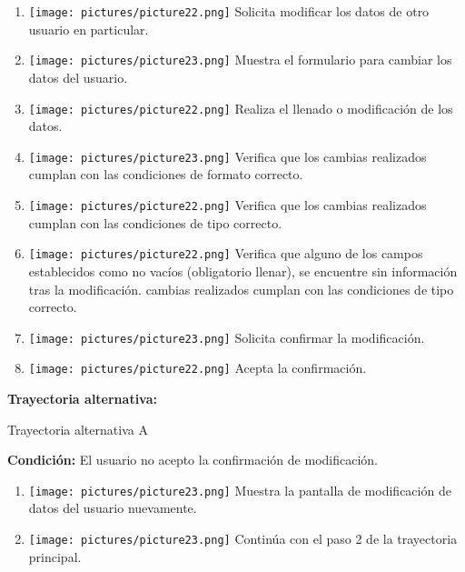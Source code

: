 \begin{enumerate} 
\item \texttt{[image: pictures/picture22.png]} Solicita modificar los datos de otro usuario en particular.
\item \texttt{[image: pictures/picture23.png]} Muestra el formulario para cambiar los datos del usuario.
\item \texttt{[image: pictures/picture22.png]} Realiza el llenado o modificación de los datos.
\item \texttt{[image: pictures/picture23.png]} Verifica que los cambias realizados cumplan con las condiciones de formato correcto.
\item \texttt{[image: pictures/picture22.png]} Verifica que los cambias realizados cumplan con las condiciones de tipo correcto.
\item \texttt{[image: pictures/picture22.png]} Verifica que alguno de los campos establecidos como no vacíos (obligatorio llenar), se encuentre sin información tras la modificación.
cambias realizados cumplan con las condiciones de tipo correcto.
\item \texttt{[image: pictures/picture23.png]} Solicita confirmar la modificación.
\item \texttt{[image: pictures/picture22.png]} Acepta la confirmación.
\end{enumerate}
\textbf{Trayectoria alternativa:}   
{\large Trayectoria alternativa A \par}
\vspace{0.3em}
\textbf{Condición:} El usuario no acepto la confirmación de modificación.
\begin{enumerate}
\item \texttt{[image: pictures/picture23.png]} Muestra la pantalla de modificación de datos del usuario nuevamente.
\item \texttt{[image: pictures/picture23.png]} Continúa con el paso 2 de la trayectoria principal.
\end{enumerate}

